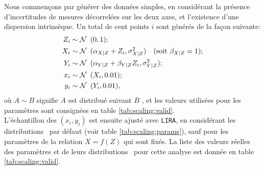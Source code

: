 Nous commençons par générer des données simples, en considérant la présence d'incertitudes de mesures décorrelées sur les deux axes, et l'existence d'une dispersion intrinsèque.
Un total de cent points $i$ sont générés de la façon suivante:
\begin{align}
    \nonumber Z_i &\sim \mathcal{N}\,\ (0, 1); \\
    \nonumber X_i &\sim \mathcal{N}\,\ (\alpha_{X|Z} + Z_i, \sigma_{X|Z}^2) \quad \text{(soit $\beta_{X|Z} = 1$)}; \\
    \nonumber Y_i &\sim \mathcal{N}\,\ (\alpha_{Y|Z} + \beta_{Y|Z} Z_i, \sigma_{Y|Z}^2); \\
    \nonumber x_i &\sim \mathcal{N}\,\ (X_i, 0.01); \\
              y_i &\sim \mathcal{N}\,\ (Y_i, 0.01),
              \label{eq:scaling:sim_sample_valid}
\end{align}
où $A \sim B$ signifie \guillemotleft $A$ est distribué suivant $B$ \guillemotright, et les valeurs utilisées pour les paramètres sont consignées en table \ref{tab:scaling:valid}. \\
L'échantillon des $(x_i, y_i)$ est ensuite ajusté avec \texttt{LIRA}, en considérant les distributions \prior\ par défaut (voir table \ref{tab:scaling:params}), sauf pour les paramètres de la relation $X = f(Z)$ qui sont fixés.
La liste des valeurs réelles des paramètres et de leurs distributions \prior\ pour cette analyse est donnée en table \ref{tab:scaling:valid}.

